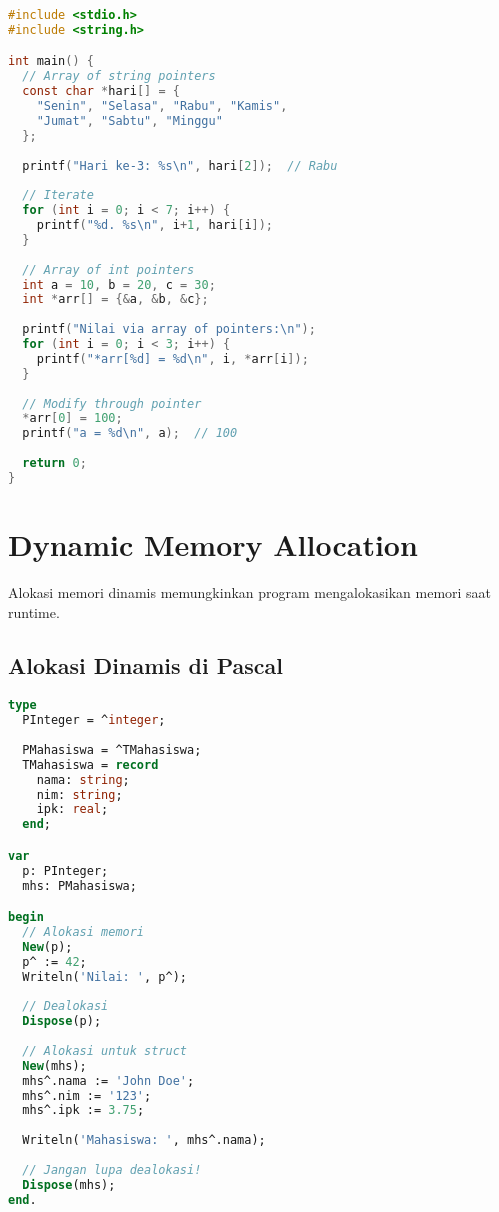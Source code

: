 \documentclass[../main.tex]{subfiles}
\begin{document}
\begin{lstlisting}[language=C, caption={Array of pointers di C}]
#include <stdio.h>
#include <string.h>

int main() {
  // Array of string pointers
  const char *hari[] = {
    "Senin", "Selasa", "Rabu", "Kamis",
    "Jumat", "Sabtu", "Minggu"
  };
  
  printf("Hari ke-3: %s\n", hari[2]);  // Rabu
  
  // Iterate
  for (int i = 0; i < 7; i++) {
    printf("%d. %s\n", i+1, hari[i]);
  }
  
  // Array of int pointers
  int a = 10, b = 20, c = 30;
  int *arr[] = {&a, &b, &c};
  
  printf("Nilai via array of pointers:\n");
  for (int i = 0; i < 3; i++) {
    printf("*arr[%d] = %d\n", i, *arr[i]);
  }
  
  // Modify through pointer
  *arr[0] = 100;
  printf("a = %d\n", a);  // 100
  
  return 0;
}
\end{lstlisting}

\section{Dynamic Memory Allocation}

Alokasi memori dinamis memungkinkan program mengalokasikan memori saat runtime.

\subsection{Alokasi Dinamis di Pascal}

\begin{lstlisting}[language=Pascal, caption={New dan Dispose di Pascal}]
type
  PInteger = ^integer;
  
  PMahasiswa = ^TMahasiswa;
  TMahasiswa = record
    nama: string;
    nim: string;
    ipk: real;
  end;

var
  p: PInteger;
  mhs: PMahasiswa;

begin
  // Alokasi memori
  New(p);
  p^ := 42;
  Writeln('Nilai: ', p^);
  
  // Dealokasi
  Dispose(p);
  
  // Alokasi untuk struct
  New(mhs);
  mhs^.nama := 'John Doe';
  mhs^.nim := '123';
  mhs^.ipk := 3.75;
  
  Writeln('Mahasiswa: ', mhs^.nama);
  
  // Jangan lupa dealokasi!
  Dispose(mhs);
end.
\end{lstlisting}
\end{document}
